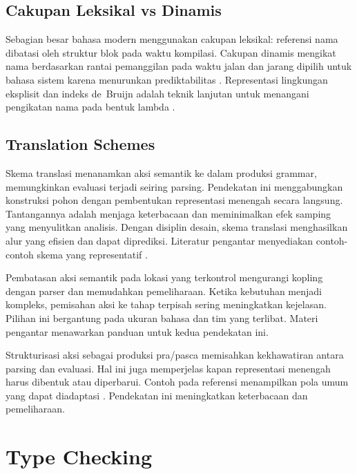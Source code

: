 \documentclass[../main.tex]{subfiles}
\begin{document}
\subsection{Cakupan Leksikal vs Dinamis}
Sebagian besar bahasa modern menggunakan cakupan leksikal: referensi nama dibatasi oleh struktur blok pada waktu kompilasi. Cakupan dinamis mengikat nama berdasarkan rantai pemanggilan pada waktu jalan dan jarang dipilih untuk bahasa sistem karena menurunkan prediktabilitas \citep{WikiScope}. Representasi lingkungan eksplisit dan indeks de~Bruijn adalah teknik lanjutan untuk menangani pengikatan nama pada bentuk lambda \citep{WikiDeBruijn}.

\subsection{Translation Schemes}
Skema translasi menanamkan aksi semantik ke dalam produksi grammar, memungkinkan evaluasi terjadi seiring parsing. Pendekatan ini menggabungkan konstruksi pohon dengan pembentukan representasi menengah secara langsung. Tantangannya adalah menjaga keterbacaan dan meminimalkan efek samping yang menyulitkan analisis. Dengan disiplin desain, skema translasi menghasilkan alur yang efisien dan dapat diprediksi. Literatur pengantar menyediakan contoh-contoh skema yang representatif \citep{WikiSDT}.

Pembatasan aksi semantik pada lokasi yang terkontrol mengurangi kopling dengan parser dan memudahkan pemeliharaan. Ketika kebutuhan menjadi kompleks, pemisahan aksi ke tahap terpisah sering meningkatkan kejelasan. Pilihan ini bergantung pada ukuran bahasa dan tim yang terlibat. Materi pengantar menawarkan panduan untuk kedua pendekatan ini.

Strukturisasi aksi sebagai produksi pra/pasca memisahkan kekhawatiran antara parsing dan evaluasi. Hal ini juga memperjelas kapan representasi menengah harus dibentuk atau diperbarui. Contoh pada referensi menampilkan pola umum yang dapat diadaptasi \citep{WikiSDT}. Pendekatan ini meningkatkan keterbacaan dan pemeliharaan.

\section{Type Checking}
\end{document}
